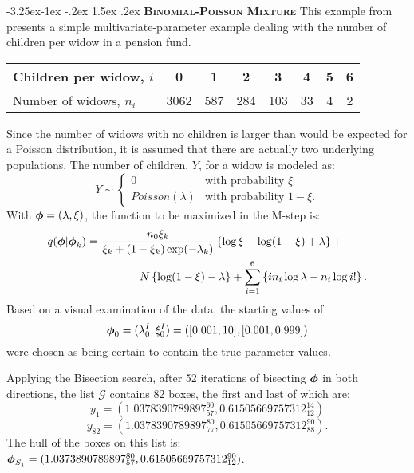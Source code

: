 \documentclass[10pt,twoside]{article}
\makeatletter
\renewcommand\subsection{\@startsection{subsection}{2}{\z@}%
                 {-3.25ex\@plus -1ex \@minus -.2ex}%
                 {1.5ex \@plus .2ex}%
                 {\scshape\centering\bfseries}} %
\makeatother
\begin{document}
\subsection{\textsc \bf Binomial-Poisson Mixture}
This example from \cite{Thisted} presents a simple
multivariate-parameter example dealing with the number
of children per widow in a pension fund.
\begin{center}
\begin{tabular}{l|c|c|c|c|c|c|c}
Children per widow, $i$ & 0 & 1 & 2 & 3 & 4 & 5 & 6 \\ \hline
Number of widows, $n_i$ & 3062 & 587 & 284 & 103 & 33 & 4 & 2
\end{tabular}
\end{center}
%
Since the number of widows with no children is larger than would be expected
for a Poisson distribution, it is assumed that there are actually two
underlying populations.  The number of children, $Y$, for a widow is modeled
as:
\begin{equation}
Y \sim \left\{ \begin{array}{ll}
0 & \mbox{with probability } \xi \\
Poisson(\lambda) & \mbox{with probability } 1-\xi.
\end{array}\right.
\end{equation}
With $\mbox{\boldmath $\phi$}=(\lambda,\xi)$, the function to be maximized in the M-step is:
\begin{eqnarray}
\lefteqn{
q(\bfphi|\bfphi_k) = \frac{n_0 \xi_k}{\xi_k + (1-\xi_k)\exp(-\lambda_k)}
\left\{ \log\xi - \log(1-\xi)+\lambda \right\} + } \nonumber \\
 & & \hspace{1in} N \left\{ \log (1-\xi) - \lambda \right\}
+ \sum_{i=1}^6 \left\{ i n_i \log \lambda - n_i \log i! \right\}.
\end{eqnarray}
Based on a visual examination of the data, the starting values of 
$$\mbox{\boldmath $\phi$}_0 = (\lambda_0^I, \xi_0^I) = ([0.001,10],[0.001,0.999])$$ 
were chosen as being certain to contain the true parameter values.

Applying the Bisection search, 
after 52 iterations of bisecting $\mbox{\boldmath $\phi$}$ in both directions, the list
$\mathcal{G}$ contains 82 boxes, the first and last of which are:
$$y_1 = (1.0378390789897_{57}^{60}, 0.61505669757312_{12}^{14})$$
$$y_{82} = (1.0378390789897_{77}^{80}, 0.61505669757312_{88}^{90}).$$
The hull of the boxes on this list is:
$\mbox{\boldmath $\phi$}_{S_1} = (1.0373890789897_{57}^{80},  0.61505669757312_{12}^{90})$.
\end{document}
